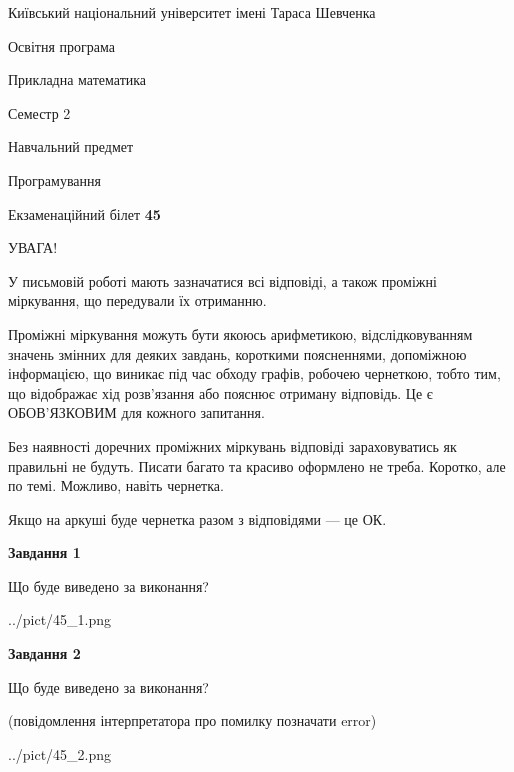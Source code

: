 \documentclass[12pt, ukrainian]{article}
\begin{document}
{{\begin {small}\par
{ \center  Київський національний університет імені Тараса Шевченка \par}
{\parbox {5 cm}{Освітня програма \hfill}{\parbox {7 cm}{Прикладна математика\hfill}}\parbox {6 cm}{\hfill Семестр 2}}\par
{\parbox {5 cm} {Навчальний предмет \hfill}\parbox {7 cm}{Програмування \hfill}\parbox {6cm}{\hfill}\par}\vspace{-7pt} \end{small}}{\center Екзаменаційний білет \No \textbf
{ 45 }\par}}
{
\begin {large}
УВАГА!

У письмовій роботі мають зазначатися всі відповіді, а також проміжні міркування, що передували їх отриманню.

Проміжні міркування можуть бути якоюсь арифметикою, відслідковуванням зна\-чень змінних для деяких завдань,
короткими поясненнями, допоміжною інформацією, що виникає під час обходу графів, робочею чернеткою,
тобто тим, що відображає хід розв’язання або пояснює отриману відповідь.
Це є ОБОВ’ЯЗКОВИМ для кожного запитання.

Без наявності доречних проміжних міркувань відповіді зараховуватись як правиль\-ні не будуть.
Писати багато та красиво оформлено не треба. Коротко, але по темі. Можли\-во, навіть чернетка.

Якщо на аркуші буде чернетка разом з відповідями --- це ОК.

\newpage

{\begin {center}\textbf{Завдання 1}\end {center}}\par
Що буде виведено за виконання?\par
\begin{center}
	{../pict/45_1.png}
\end{center}
\newpage

{\begin {center}\textbf{Завдання 2}\end {center}}\par
Що буде виведено за виконання?\par
 (повідомлення інтерпретатора про помилку позначати error)\par
\begin{center}
	{../pict/45_2.png}
\end{center}
\newpage


\end{large}}
\end{document}

